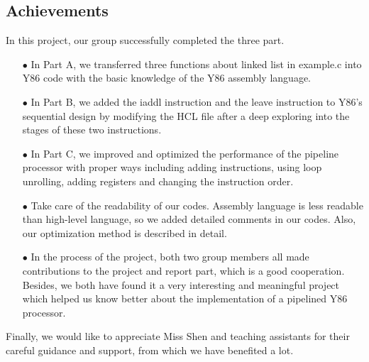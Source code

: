 \documentclass{article}
\begin{document}
\subsection{Achievements}
In this project, our group successfully completed the three part.
\begin{itemize}
\item[$\bullet$] In Part A, we transferred three functions about linked list in example.c into Y86 code with the basic knowledge of the Y86 assembly language. 
\item[$\bullet$] In Part B, we added the iaddl instruction and the leave instruction to Y86’s sequential design by modifying the HCL file after a deep exploring into the stages of these two instructions. 
\item[$\bullet$] In Part C, we improved and optimized the performance of the pipeline processor with proper ways including adding instructions, using loop unrolling, adding registers and changing the instruction order.
\item[$\bullet$] Take care of the readability of our codes. Assembly language is less readable than high-level language, so we added detailed comments in our codes. Also, our optimization method is described in detail.
\item[$\bullet$] In the process of the project, both two group members all made contributions to the project and report part, which is a good cooperation. Besides, we both have found it a very interesting and meaningful project which helped us know better about the implementation of a pipelined Y86 processor. 
\end{itemize}
Finally, we would like to appreciate Miss Shen and teaching assistants for their careful guidance and support, from which we have benefited a lot.



\end{document}

